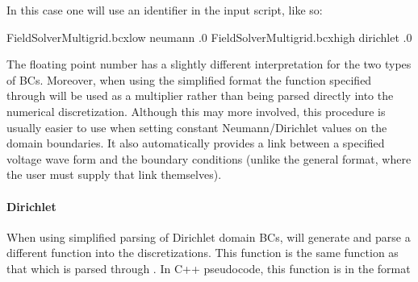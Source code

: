 \documentclass[letterpaper,10pt,english]{sphinxmanual}
\begin{document}
In this case one will use an identifier  in the input script, like so:

\begin{sphinxVerbatim}[commandchars=\\\{\},formatcom=\scriptsize]
FieldSolverMultigrid.bc\PYGZus{}x\PYGZus{}low   neumann   .0
FieldSolverMultigrid.bc\PYGZus{}x\PYGZus{}high  dirichlet .0
\end{sphinxVerbatim}

The floating point number has a slightly different interpretation for the two types of BCs.
Moreover, when using the simplified format the function specified through  will be used as a multiplier rather than being parsed directly into the numerical discretization.
Although this may  more involved, this procedure is usually easier to use when setting constant Neumann/Dirichlet values on the domain boundaries.
It also automatically provides a link between a specified voltage wave form and the boundary conditions (unlike the general format, where the user must supply that link themselves).


\paragraph{Dirichlet}
\label{\detokenize{Solvers/Electrostatics:dirichlet}}
When using simplified parsing of Dirichlet domain BCs,  will generate and parse a different function into the discretizations.
This function is  the same function as that which is parsed through .
In C++ pseudo\sphinxhyphen{}code, this function is in the format

\begin{sphinxVerbatim}[commandchars=\\\{\},formatcom=\scriptsize]
 

   \PYG{p}{[} \PYG{p}{]}        
         
\end{sphinxVerbatim}
\end{document}

